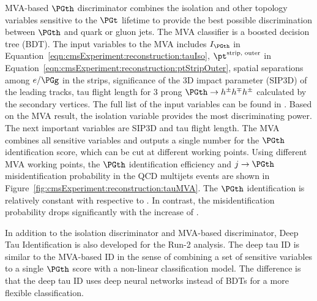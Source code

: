 MVA-based $\PGth$ discriminator combines the isolation and other topology variables sensitive to the $\PGt$ lifetime \cite{Sirunyan:2018pgf} to provide the best possible discrimination between $\PGth$ and quark or gluon jets. The MVA classifier is a boosted decision tree (BDT). The input variables to the MVA includes $I_{\PGth}$ in Equantion~\ref{eqn:cmsExperiment:reconstruction:tauIso}, $ \pt^{\text{strip, outer}}$ in Equation~\ref{eqn:cmsExperiment:reconstruction:ptStripOuter}, spatial separations among $e/\PGg$ in the strips, significance of the 3D impact parameter (SIP3D) of the leading tracks, tau flight length for 3 prong $\PGth \to h^\pm h^\mp h^\pm$ calculated by the secondary vertices. The full list of the input variables can be found in \cite{Chatrchyan:2012zz, Khachatryan:2015dfa}. Based on the MVA result, the isolation variable provides the most discriminating power. The next important variables are SIP3D and tau flight length. The MVA combines all sensitive variables and outputs a single number for the $\PGth$ identification score, which can be cut at different working points. Using different MVA working points, the $\PGth$ identification efficiency and $j\to \PGth$ misidentification probability in the QCD multijets events are shown in Figure~\ref{fig:cmsExperiment:reconstruction:tauMVA}. The $\PGth$ identification is relatively constant with respective to \pt. In contrast, the misidentification probability drops significantly with the increase of \pt. 

In addition to the isolation discriminator and MVA-based discriminator, Deep Tau Identification is also developed for the Run-2 analysis. The deep tau ID is similar to the MVA-based ID in the sense of combining a set of sensitive variables to a single $\PGth$ score with a non-linear classification model. The difference is that the deep tau ID uses deep neural networks instead of BDTs for a more flexible classification. 





